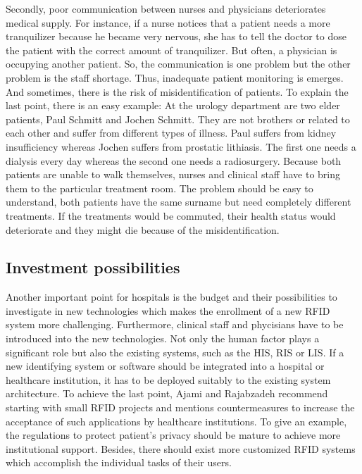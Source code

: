Secondly, poor communication between nurses and physicians deteriorates medical supply. For instance, if a nurse notices that a patient needs a more tranquilizer because he became very nervous, she has to tell the doctor to dose the patient with the correct amount of tranquilizer. But often, a physician is occupying another patient. So, the communication is one problem but the other problem is the staff shortage. Thus, inadequate patient monitoring is emerges. And sometimes, there is the risk of misidentification of patients. To explain the last point, there is an easy example: At the urology department are two elder patients, Paul Schmitt and Jochen Schmitt. They are not brothers or related to each other and suffer from different types of illness. Paul suffers from kidney insufficiency whereas Jochen suffers from prostatic lithiasis. The first one needs a dialysis every day whereas the second one needs a radiosurgery. Because both patients are unable to walk themselves, nurses and clinical staff have to bring them to the particular treatment room. The problem should be easy to understand, both patients have the same surname but need completely different treatments. If the treatments would be commuted, their health status would deteriorate and they might die because of the misidentification.

\subsection{Investment possibilities}

Another important point for hospitals is the budget and their possibilities to investigate in new technologies which makes the enrollment of a new RFID system more challenging. Furthermore, clinical staff and phycisians have to be introduced into the new technologies. Not only the human factor plays a significant role but also the existing systems, such as the \ac{HIS}, \ac{RIS} or \ac{LIS}. If a new identifying system or software should be integrated into a hospital or healthcare institution, it has to be deployed suitably to the existing system architecture. To achieve the last point, Ajami and Rajabzadeh \cite{ncbi} recommend starting with small RFID projects and mentions countermeasures to increase the acceptance of such applications by healthcare institutions. To give an example, the regulations to protect patient's privacy should be mature to achieve more institutional support. Besides, there should exist more customized RFID systems which accomplish the individual tasks of their users.  

